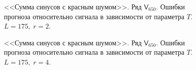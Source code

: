 \documentclass[specialist,
               substylefile = spbu.rtx,
               subf,href,colorlinks=true, 12p]{disser}
\begin{document}
\begin{figure}[H]
	\captionsetup{justification=centering}
	\caption{<<Сумма синусов с красным шумом>>. Ряд $\mathsf{V}_{650}$. Ошибки прогноза относительно сигнала в зависимости от параметра $T$. $L = 175, \; r = 2$.}
\end{figure}

\begin{figure}[H]
	\captionsetup{justification=centering}
	\caption{<<Сумма синусов с красным шумом>>. Ряд $\mathsf{V}_{650}$. Ошибки прогноза относительно сигнала в зависимости от параметра $T$. $L = 175, \; r = 4$.}
\end{figure}
\end{document}
